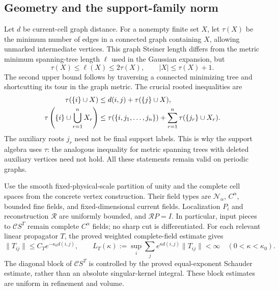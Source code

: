 \documentclass[11pt]{article}
\theoremstyle{remark}
\begin{document}
\subsection{Geometry and the support-family norm}
\label{cl-geometry-section}

Let $d$ be current-cell graph distance. For a nonempty finite set $X$,
let $\tau(X)$ be the minimum number of edges in a connected graph
containing $X$, allowing unmarked intermediate vertices. This graph
Steiner length differs from the metric minimum spanning-tree length
$\ell$ used in the Gaussian expansion, but
\begin{equation}
 \tau(X)\le\ell(X)\le2\tau(X),\qquad |X|\le\tau(X)+1.       \label{cl-metric-comparison}
\end{equation}
The second upper bound follows by traversing a connected minimizing
tree and shortcutting its tour in the graph metric. The crucial rooted
inequalities are
\begin{align}
 \tau(\{i\}\cup X)&\le d(i,j)+\tau(\{j\}\cup X),\notag\\
 \tau\left(\{i\}\cup\bigcup_{r=1}^nX_r\right)
 &\le\tau(\{i,j_1,\ldots,j_n\})
                         +\sum_{r=1}^n\tau(\{j_r\}\cup X_r).
                                                               \label{cl-root-gluing}
\end{align}
The auxiliary roots $j_r$ need not be final support labels. This is why
the support algebra uses $\tau$: the analogous inequality for metric
spanning trees with deleted auxiliary vertices need not hold. All these
statements remain valid on periodic graphs.

Use the smooth fixed-physical-scale partition of unity and the complete
cell spaces from the concrete vertex construction. Their field types
are $\mathcal N_\alpha$, $C^\alpha$, bounded fine fields, and
fixed-dimensional current fields. Localization $P_i$ and reconstruction
$\mathcal R$ are uniformly bounded, and $\mathcal R P=I$.
In particular, input pieces to $\mathcal C S^T$ remain complete
$C^\alpha$ fields; no sharp cut is differentiated. For each relevant
linear propagator $T$, the proved weighted complete-field estimate gives
\begin{equation}
 \|T_{ij}\|\le C_Te^{-\kappa_0d(i,j)},\qquad
 L_T(\kappa):=\sup_i\sum_j e^{\kappa d(i,j)}\|T_{ij}\|<\infty
 \quad(0<\kappa<\kappa_0).                                  \label{cl-linear-blocks}
\end{equation}
The diagonal block of $\mathcal C S^T$ is controlled by the proved
equal-exponent Schauder estimate, rather than an absolute singular-kernel
integral. These block estimates are uniform in refinement and volume.
\end{document}
